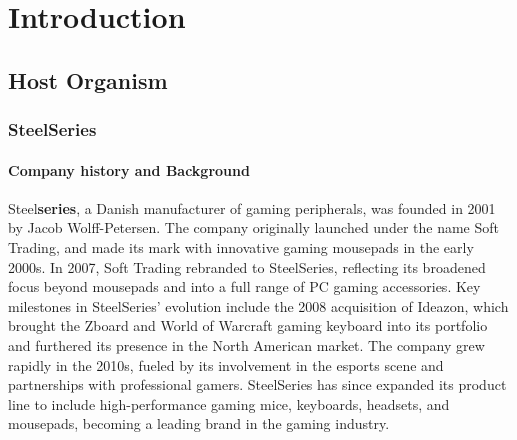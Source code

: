 \chapter{Introduction}

\section{Host Organism}
\subsection{SteelSeries}
\subsubsection{Company history and Background}
Steel\textbf{series}, a Danish manufacturer of gaming peripherals, was founded in 2001 by Jacob Wolff-Petersen. The company originally launched under the name Soft Trading, and made its mark with innovative gaming mousepads in the early 2000s. In 2007, Soft Trading rebranded to SteelSeries, reflecting its broadened focus beyond mousepads and into a full range of PC gaming accessories. Key milestones in SteelSeries' evolution include the 2008 acquisition of Ideazon, which brought the Zboard and World of Warcraft gaming keyboard into its portfolio and furthered its presence in the North American market.
The company grew rapidly in the 2010s, fueled by its involvement in the esports scene and partnerships with professional gamers. SteelSeries has since expanded its product line to include high-performance gaming mice, keyboards, headsets, and mousepads, becoming a leading brand in the gaming industry.

